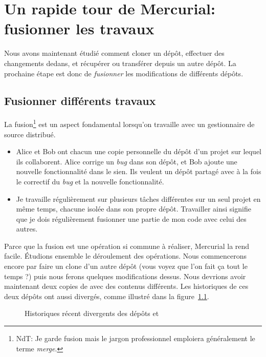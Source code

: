 \chapter{Un rapide tour de Mercurial: fusionner les travaux}
\label{chap:tour-merge}

Nous avons maintenant étudié comment cloner un dépôt, effectuer
des changements dedans, et récupérer ou transférer depuis un 
autre dépôt. La prochaine étape est donc de \emph{fusionner} les
modifications de différents dépôts.

\section{Fusionner différents travaux} %
La fusion\footnote{NdT: Je garde fusion mais le jargon professionnel 
emploiera généralement le terme \textit{merge}.} est un aspect 
fondamental lorsqu'on travaille avec un gestionnaire de source 
distribué.
\begin{itemize}
\item Alice et Bob ont chacun une copie personnelle du dépôt d'un
  projet sur lequel ils collaborent. Alice corrige un \textit{bug} 
  dans son dépôt, et Bob ajoute une nouvelle fonctionnalité dans le
  sien. Ils veulent un dépôt partagé avec à la fois le correctif du
  \textit{bug} et la nouvelle fonctionnalité.
\item Je travaille régulièrement sur plusieurs tâches différentes sur
  un seul projet en même temps, chacune isolée dans son propre dépôt.
  Travailler ainsi signifie que je dois régulièrement fusionner une 
  partie de mon code avec celui des autres.
\end{itemize}

Parce que la fusion est une opération si commune à réaliser,
Mercurial la rend facile. Étudions ensemble le déroulement des opérations.
Nous commencerons encore par faire un clone d'un autre dépôt (vous voyez
que l'on fait ça tout le temps ?) puis nous ferons quelques modifications
dessus.
Nous devrions avoir maintenant deux copies de  avec 
des contenus différents. Les historiques de ces deux dépôts ont aussi 
divergés, comme illustré dans la figure~\ref{fig:tour-merge:sep-repos}.


\begin{figure}[ht]
  \centering
  \caption{Historiques récent divergents des dépôts  
  et }
  \label{fig:tour-merge:sep-repos}
\end{figure}

